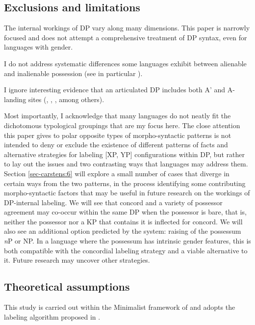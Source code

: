 \documentclass[output=paper
,modfonts
,nonflat]{langsci/langscibook}
\begin{document}
\subsection{Exclusions and limitations} \label{sec-carstens:1.3}
The internal workings of DP vary along many dimensions. This paper is narrowly focused and does not attempt a comprehensive treatment of DP syntax, even for languages with gender.

I do not address systematic differences some languages exhibit between alienable and inalienable possession (see in particular \citealt{Den_Dikken2015}).     

I ignore interesting evidence that an articulated DP includes both A' and A-landing sites (\citealt{Szabolcsi1983}, \citealt{Gavruseva2000}, \citealt{Alexiadou2001}, \citealt{Haegeman2004} among others).    

Most importantly, I acknowledge that many languages do not neatly fit the dichotomous typological groupings that are my focus here. The close attention this paper gives to polar opposite types of morpho-syntactic patterns is not intended to deny or exclude the existence of different patterns of facts and alternative strategies for labeling [XP, YP] configurations within DP, but rather to lay out the issues and two contrasting ways that languages may address them. Section \ref{sec-carstens:6} will explore a small number of cases that diverge in certain ways from the two patterns, in the process identifying some contributing morpho-syntactic factors that may be useful in future research on the workings of DP-internal labeling. We will see that concord and a variety of possessor agreement may co-occur within the same DP when the possessor is bare, that is, neither the possessor nor a KP that contains it is inflected for concord. We will also see an additional option predicted by the system: raising of the possessum \textit{n}P or NP. In a language where the possessum has intrinsic gender features, this is both compatible with the concordial labeling strategy and a viable alternative to it. Future research may uncover other strategies.    

\subsection{Theoretical assumptions} \label{sec-carstens:1.4}
This study is carried out within the Minimalist framework of \citet{Chomsky2000, Chomsky2001} and adopts the labeling algorithm proposed in \citet{Chomsky2013, Chomsky2015}. 
\end{document}
